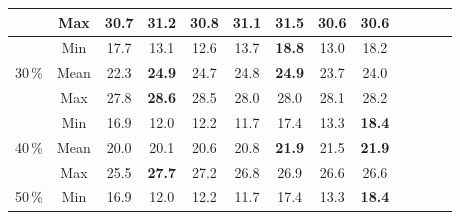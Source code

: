 \documentclass[fleqn,11pt]{ExcelAtFIT} %
\begin{document}
\begin{table}[t!]
\begin{tabular}{| c | c | c| c | c | c | c | c | c | c | c | c | c |}
         &\textcolor{grayintable}{Max}& \textcolor{grayintable}{30.7} & \textcolor{grayintable}{31.2}  & \textcolor{grayintable}{30.8}
         & \textcolor{grayintable}{31.1} & \textcolor{grayintable}{{\bf 31.5}} & \textcolor{grayintable}{30.6}& \textcolor{grayintable}{30.6} \\ \hline \hline

         \multirow{3}{*}{30\,\%}&\textcolor{grayintable}{Min}& \textcolor{grayintable}{17.7} & \textcolor{grayintable}{13.1}
         & \textcolor{grayintable}{12.6} & \textcolor{grayintable}{13.7} & \textcolor{grayintable}{{\bf 18.8}} & \textcolor{grayintable}{13.0}& \textcolor{grayintable}{18.2} \\ %

         &Mean& 22.3 & {\bf 24.9}  & 24.7
         & 24.8 & {\bf 24.9} & 23.7& 24.0 \\ %

         &\textcolor{grayintable}{Max}& \textcolor{grayintable}{27.8} & \textcolor{grayintable}{{\bf 28.6}}  & \textcolor{grayintable}{28.5}
         & \textcolor{grayintable}{28.0} & \textcolor{grayintable}{28.0} & \textcolor{grayintable}{28.1}& \textcolor{grayintable}{28.2} \\ \hline \hline

        \multirow{3}{*}{40\,\%} &\textcolor{grayintable}{Min}& \textcolor{grayintable}{16.9} & \textcolor{grayintable}{12.0}  & \textcolor{grayintable}{12.2}
        & \textcolor{grayintable}{11.7} & \textcolor{grayintable}{17.4} & \textcolor{grayintable}{13.3}& \textcolor{grayintable}{{\bf 18.4}} \\ %

         &Mean& 20.0 & 20.1  & 20.6
         & 20.8 & {\bf 21.9} & 21.5 & {\bf 21.9} \\ %

         &\textcolor{grayintable}{Max}& \textcolor{grayintable}{25.5} & \textcolor{grayintable}{{\bf 27.7}}  & \textcolor{grayintable}{27.2}
         & \textcolor{grayintable}{26.8} & \textcolor{grayintable}{26.9} & \textcolor{grayintable}{26.6}& \textcolor{grayintable}{26.6} \\ \hline\hline

         \multirow{3}{*}{50\,\%} &\textcolor{grayintable}{Min}& \textcolor{grayintable}{16.9} & \textcolor{grayintable}{12.0}  & \textcolor{grayintable}{12.2}
        & \textcolor{grayintable}{11.7} & \textcolor{grayintable}{17.4} & \textcolor{grayintable}{13.3}& \textcolor{grayintable}{{\bf 18.4}} \\ %


\end{tabular}
\end{table}
\end{document}
